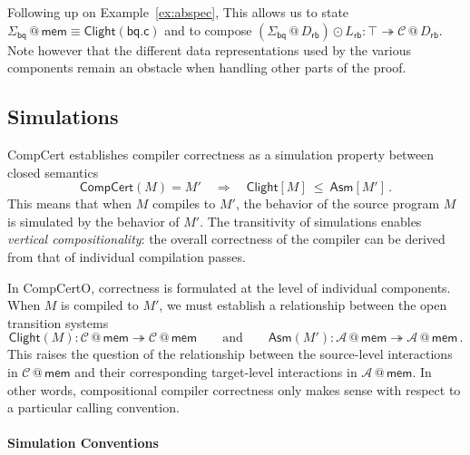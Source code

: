 \documentclass[acmsmall,screen,review,anonymous]{acmart}
\newcommand{\kw}[1]{\ensuremath{ \mathsf{#1} }}
\begin{document}

\begin{example} \label{ex:abspeclift} %
Following up on Example~\ref{ex:abspec},
This allows us to state
$\Sigma_\kw{bq} \mathbin@ \kw{mem} \equiv \kw{Clight}(\kw{bq.c})$
and to compose
$
  (\Sigma_\kw{bq} \mathbin@ D_\kw{rb}) \odot L_\kw{rb} :
  \top \twoheadrightarrow \mathcal{C} \mathbin@ D_\kw{rb}
$.
Note however that the different data representations
used by the various components
remain an obstacle when handling other parts of the proof.
\end{example}


\subsection{Simulations} \label{sec:overview:sim} %


CompCert establishes compiler correctness
as a simulation property between closed semantics
\[
  \kw{CompCert}(M) = M'
  \quad\Rightarrow\quad
  \kw{Clight}[M] \:\le\: \kw{Asm}[M']
  \,.
\]
This means that when $M$ compiles to $M'$,
the behavior of the source program $M$
is simulated by the behavior of $M'$.
The transitivity of simulations enables
\emph{vertical compositionality}:
the overall correctness of the compiler
can be derived from that of
individual compilation passes.

In CompCertO,
correctness is formulated at the level of
individual components.
When $M$ is compiled to $M'$,
we must establish a relationship between
the open transition systems
\[
  \kw{Clight}(M) :
    \mathcal{C} \mathbin@ \kw{mem} \twoheadrightarrow
    \mathcal{C} \mathbin@ \kw{mem}
  \qquad \text{and} \qquad
  \kw{Asm}(M') :
    \mathcal{A} \mathbin@ \kw{mem} \twoheadrightarrow
    \mathcal{A} \mathbin@ \kw{mem}
  \,.
\]
This raises the question of the relationship
between the source-level interactions
in $\mathcal{C} \mathbin@ \kw{mem}$
and their corresponding target-level interactions
in $\mathcal{A} \mathbin@ \kw{mem}$.
In other words,
compositional compiler correctness only makes sense
with respect to a particular calling convention.


\paragraph{Simulation Conventions} %
\end{document}
